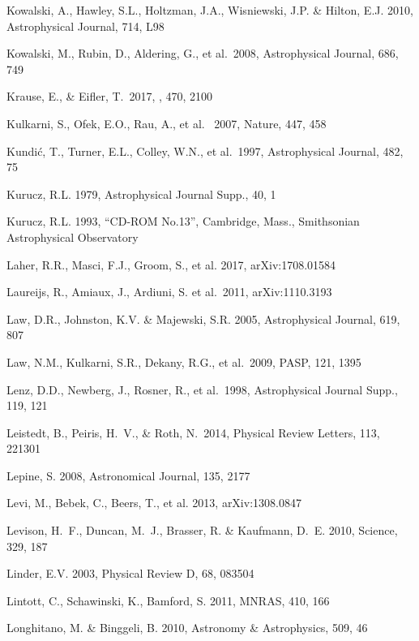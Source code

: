 \documentclass[twocolumn]{aastex61}
\begin{document}
\begin{thebibliography}{}

\bibitem[()]{} Kowalski, A., Hawley, S.L., Holtzman, J.A., Wisniewski, J.P. \& Hilton, E.J. 2010, Astrophysical Journal, 714, L98

\bibitem[()]{} Kowalski, M., Rubin, D., Aldering, G., et al.~2008,  Astrophysical Journal, 686, 749

\bibitem[()]{} Krause, E., \& Eifler, T.\ 2017, \mnras, 470, 2100

\bibitem[()]{} Kulkarni, S., Ofek, E.O., Rau, A., et al.~ 2007, Nature, 447, 458

\bibitem[()]{} Kundi\'{c}, T., Turner, E.L., Colley, W.N., et al.~1997, Astrophysical Journal, 482, 75

\bibitem[()]{} Kurucz, R.L. 1979, Astrophysical Journal Supp., 40, 1

\bibitem[()]{} Kurucz, R.L. 1993, ``CD-ROM No.13”, Cambridge, Mass., Smithsonian Astrophysical Observatory

\bibitem[()]{} Laher, R.R., Masci, F.J., Groom, S., et al. 2017, arXiv:1708.01584

\bibitem[()]{} Laureijs, R., Amiaux, J., Ardiuni, S. et al.~2011, arXiv:1110.3193

\bibitem[()]{} Law, D.R., Johnston, K.V. \& Majewski, S.R. 2005,  Astrophysical Journal, 619, 807

\bibitem[()]{} Law, N.M., Kulkarni, S.R., Dekany, R.G., et al.~2009, PASP, 121, 1395

\bibitem[()]{} Lenz, D.D., Newberg, J., Rosner, R., et al.~1998, Astrophysical Journal Supp., 119, 121

\bibitem[()]{} Leistedt, B., Peiris, H.~V., \& Roth, N.\ 2014, Physical Review Letters, 113, 221301

\bibitem[()]{} Lepine, S. 2008, Astronomical Journal, 135, 2177

\bibitem[()]{} Levi, M., Bebek, C., Beers, T., et al. 2013, arXiv:1308.0847

\bibitem[()]{} Levison, H.~F., Duncan, M.~J., Brasser, R. \& Kaufmann, D.~E. 2010, Science, 329, 187

\bibitem[()]{} Linder, E.V. 2003, Physical Review D, 68, 083504

 Lintott, C., Schawinski, K., Bamford, S. 2011, MNRAS,
  410, 166

\bibitem[()]{} Longhitano, M. \& Binggeli, B. 2010, Astronomy \& Astrophysics, 509, 46


\end{thebibliography}
\end{document}

